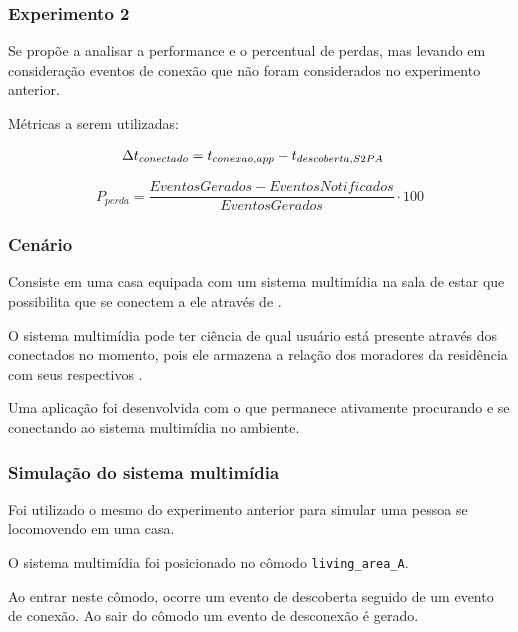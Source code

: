 \documentclass[aspectratio=169]{beamer}
\begin{document}
\begin{frame}
	\frametitle{Experimento 2}
	Se propõe a analisar a performance e o percentual de perdas, mas levando em consideração eventos de conexão que não foram considerados no experimento anterior.

	\bigskip

	Métricas a serem utilizadas:
	
	\begin{align}
		\label{equ:performance-ready}
		\Delta t_{conectado} &= t_{conexao,app} - t_{descoberta,S2PA}
	\end{align}
	
	\begin{equation}
		P_{perda} = \frac{EventosGerados - EventosNotificados}{EventosGerados} \cdot 100
	\end{equation}
\end{frame}

\begin{frame}
	\frametitle{Cenário}
	Consiste em uma casa equipada com um sistema multimídia na sala de estar que possibilita que \smartphones se conectem a ele através de \bluetooth.

	\bigskip

	O sistema multimídia pode ter ciência de qual usuário está presente através dos \smartphones conectados no momento, pois ele armazena a relação dos moradores da residência com seus respectivos \smartphones.

	\bigskip

	Uma aplicação \android foi desenvolvida com o \middleware \mhubcddl que permanece ativamente procurando e se conectando ao sistema multimídia no ambiente.
\end{frame}

\begin{frame}
	\frametitle{Simulação do sistema multimídia}
	Foi utilizado o mesmo \dataset do experimento anterior para simular uma pessoa se locomovendo em uma casa.

	\bigskip

	O sistema multimídia foi posicionado no cômodo \texttt{living\_area\_A}.

	\bigskip

	Ao entrar neste cômodo, ocorre um evento de descoberta seguido de um evento de conexão. Ao sair do cômodo um evento de desconexão é gerado.
\end{frame}
\end{document}
